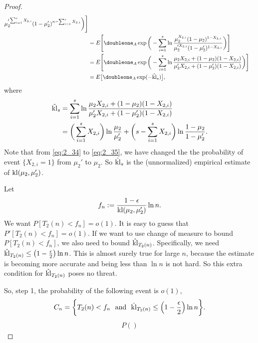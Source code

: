 \begin{proof}
\begin{align}
                {\mu_2'^{\sum_{i=1}^s X_{2,i}}(1-\mu_2')^{n-\sum_{i=1}^s X_{2,i}}}\bigg)\Bigg] \\
            &= E\Bigg[\doubleone_A \exp\bigg(-\sum_{i=1}^s \ln
                \frac{\mu_2^{X_{2,i}}(1-\mu_2)^{1-X_{2,i}}}
                {\mu_2'^{X_{2,i}}(1-\mu_2')^{1-X_{2,i}}}\bigg)\Bigg] \\
            &= E\Bigg[\doubleone_A \exp\bigg(-\sum_{i=1}^s \ln
                \frac{\mu_2 X_{2,i} + (1-\mu_2) (1-X_{2,i})}
                {\mu_2' X_{2,i} + (1-\mu_2')(1-X_{2,i})}\bigg)\Bigg] \\
            &= E\big[\doubleone_A \exp(-\hat\kl_s)\big],
    \end{align}
    where
    \begin{align}
        \hat{{\mathop{\mathrm{kl}}}}_s
            &= \sum_{i=1}^s \ln
                \frac{\mu_2 X_{2,i} + (1-\mu_2) (1-X_{2,i})}
                {\mu_2' X_{2,i} + (1-\mu_2')(1-X_{2,i})} \\
            &= \bigg(\sum_{i=1}^s X_{2,i}\bigg)\ln\frac{\mu_2}{\mu_2'} +
                \bigg(s-\sum_{i=1}^s X_{2,i}\bigg)\ln\frac{1-\mu_2}{1-\mu_2'}.
    \end{align}
    Note that from \eqref{eq:2_34} to \eqref{eq:2_35},
    we have changed the the probability of event $\{X_{2,i}=1\}$ from $\mu_2'$ to $\mu_2$.
    So $\hat{{\mathop{\mathrm{kl}}}}_s$ is the (unnormalized) empirical estimate of ${\mathop{\mathrm{kl}}}(\mu_2,\mu_2')$.

    Let
    \begin{equation}
        f_n:=\frac{1-\epsilon}{{\mathop{\mathrm{kl}}}(\mu_2,\mu_2')}\ln n.
    \end{equation}
    We want $P[T_2(n)<f_n]=o(1)$.
    It is easy to guess that $P'[T_2(n)<f_n]=o(1)$.
    If we want to use change of measure to bound $P[T_2(n)<f_n]$,
    we also need to bound $\hat{{\mathop{\mathrm{kl}}}}_{T_2(n)}$.
    Specifically, we need $\hat{{\mathop{\mathrm{kl}}}}_{T_2(n)} \le \big(1-\frac{\epsilon}{2}\big)\ln n$.
    This is almost surely true for large $n$,
    because the estimate is becoming more accurate
    and being less than $\ln n$ is not hard.
    So this extra condition for $\hat{{\mathop{\mathrm{kl}}}}_{T_2(n)}$ poses no threat.

    So, step 1, the probability of the following event is $o(1)$,
    \begin{align}
        C_n=\bigg\{ T_2(n)<f_n
            ~~\text{and}~~
            \hat {{\mathop{\mathrm{kl}}}}_{T_2(n)} \le \Big(1-\frac{\epsilon}{2}\Big)\ln n \bigg\}.
    \end{align}
    \begin{align}
        P()
    \end{align}
\end{proof}
